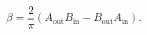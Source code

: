 \begin{equation}\label{eq:bogolubov}
\beta=\frac{2}{\pi}(A_\mathrm{out}B_\mathrm{in}
-B_\mathrm{out}A_\mathrm{in}).
\end{equation} 
